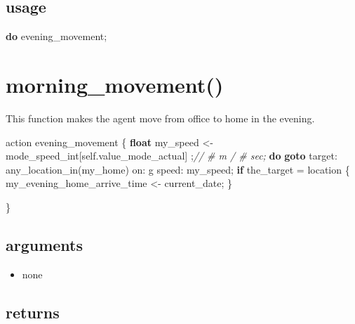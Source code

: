 \documentclass[]{book}
\newenvironment{Shaded}{\begin{snugshade}}{\end{snugshade}}
\newcommand{\CommentTok}[1]{\textcolor[rgb]{0.56,0.35,0.01}{\textit{#1}}}
\newcommand{\KeywordTok}[1]{\textcolor[rgb]{0.13,0.29,0.53}{\textbf{#1}}}
\newcommand{\NormalTok}[1]{#1}
\newcommand{\OtherTok}[1]{\textcolor[rgb]{0.56,0.35,0.01}{#1}}
\providecommand{\tightlist}{%
  \setlength{\itemsep}{0pt}\setlength{\parskip}{0pt}}
\theoremstyle{definition}
\theoremstyle{definition}
\theoremstyle{definition}
\theoremstyle{remark}
\begin{document}
\hypertarget{usage-1}{%
\subsection*{usage}\label{usage-1}}

\begin{Shaded}
\begin{Highlighting}[]

\KeywordTok{do}\NormalTok{ evening_movement}\OtherTok{;}
\end{Highlighting}
\end{Shaded}

\hypertarget{morning_movement}{%
\section{morning\_movement()}\label{morning_movement}}

This function makes the agent move from office to home in the evening.

\begin{Shaded}
\begin{Highlighting}[]
\NormalTok{action evening_movement}
\NormalTok{    \{}
        \KeywordTok{float}\NormalTok{ my_speed <- mode_speed_int}\OtherTok{[}\NormalTok{self.value_mode_actual}\OtherTok{]} \OtherTok{;}\CommentTok{// # m / # sec;}
        \KeywordTok{do} \KeywordTok{goto}\NormalTok{ target: any_location_in}\OtherTok{(}\NormalTok{my_home}\OtherTok{)}\NormalTok{ on: g speed: my_speed}\OtherTok{;}
        \KeywordTok{if}\NormalTok{ the_target = location}
\NormalTok{        \{}
\NormalTok{            my_evening_home_arrive_time <- current_date}\OtherTok{;}
\NormalTok{        \}}

\NormalTok{    \}}
\end{Highlighting}
\end{Shaded}

\hypertarget{arguments-2}{%
\subsection*{arguments}\label{arguments-2}}

\begin{itemize}
\tightlist
\item
  none
\end{itemize}

\hypertarget{returns-2}{%
\subsection*{returns}\label{returns-2}}
\end{document}
